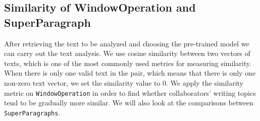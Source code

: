 \subsection{Similarity of WindowOperation and SuperParagraph}
After retrieving the text to be analyzed and choosing the  pre-trained model we can carry out the text analysis. We use cosine similarity between two vectors of texts, which is one of the most commonly used metrics for measuring similarity. When there is only one valid text in the pair, which means that there is only one non-zero text vector, we set the similarity value to 0. We apply the similarity metric on \texttt{WindowOperation} in order to find whether collaborators' writing topics tend to be gradually more similar. We will also look at the comparisons between \texttt{SuperParagraphs}.
\label{sub:similarity}
